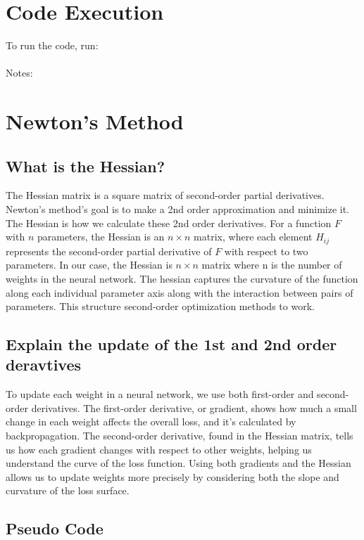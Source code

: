 \documentclass{article}
\begin{document}
\newpage

\section*{Code Execution}

To run the code, run: \\ \\
Notes: 

\section*{Newton's Method}

\subsection*{What is the Hessian?}
The Hessian matrix is a square matrix of second-order partial derivatives. Newton's method's goal is to make a 2nd order approximation and minimize it. The Hessian is how we calculate these 2nd order derivatives. For a function \( F \) with \( n \) parameters, the Hessian is an \( n \times n \) matrix, where each element \( H_{ij} \) represents the second-order partial derivative of \( F \) with respect to two parameters. In our case, the Hessian is \( n \times n \) matrix where n is the number of weights in the neural network. The hessian captures the curvature of the function along each individual parameter axis along with the interaction between pairs of parameters. This structure second-order optimization methods to work.

\subsection*{Explain the update of the 1st and 2nd order deravtives}
To update each weight in a neural network, we use both first-order and second-order derivatives. The first-order derivative, or gradient, shows how much a small change in each weight affects the overall loss, and it’s calculated by backpropagation. The second-order derivative, found in the Hessian matrix, tells us how each gradient changes with respect to other weights, helping us understand the curve of the loss function. Using both gradients and the Hessian allows us to update weights more precisely by considering both the slope and curvature of the loss surface.



\subsection*{Pseudo Code}
\end{document}
